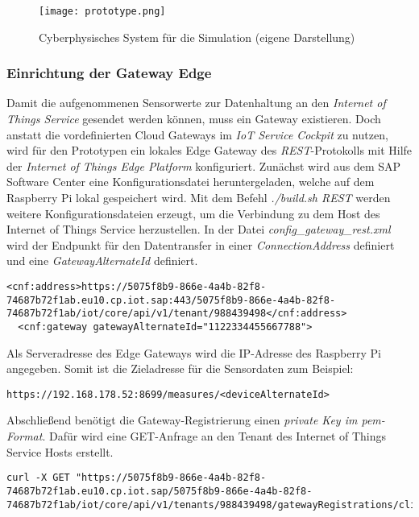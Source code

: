 \begin{figure}[H]
  \centering
  \texttt{[image: prototype.png]}
  \caption[Cyberphysisches System für die Simulation]{Cyberphysisches System für die Simulation (eigene Darstellung)}
  \label{raspi}
\end{figure}


\subsubsection{Einrichtung der Gateway Edge}

Damit die aufgenommenen Sensorwerte zur Datenhaltung an den \textit{Internet of Things Service} gesendet werden können, muss ein Gateway existieren. Doch anstatt die vordefinierten Cloud Gateways im \textit{IoT Service Cockpit} zu nutzen, wird für den Prototypen ein lokales Edge Gateway des \textit{REST}-Protokolls mit Hilfe der \textit{Internet of Things Edge Platform} konfiguriert. Zunächst wird aus dem SAP Software Center eine Konfigurationsdatei heruntergeladen, welche auf dem Raspberry Pi lokal gespeichert wird. Mit dem Befehl \textit{./build.sh REST} werden weitere Konfigurationsdateien erzeugt, um die Verbindung zu dem Host des Internet of Things Service herzustellen. In der Datei \textit{config\_gateway\_rest.xml} wird der Endpunkt für den Datentransfer in einer \textit{ConnectionAddress} definiert und eine \textit{GatewayAlternateId} definiert.

\begin{lstlisting}[caption= Gateway-Verbindung zur Cloud]
  <cnf:address>https://5075f8b9-866e-4a4b-82f8-74687b72f1ab.eu10.cp.iot.sap:443/5075f8b9-866e-4a4b-82f8-74687b72f1ab/iot/core/api/v1/tenant/988439498</cnf:address>
  <cnf:gateway gatewayAlternateId="1122334455667788">
\end{lstlisting}
Als Serveradresse des Edge Gateways wird die IP-Adresse des Raspberry Pi angegeben. Somit ist die Zieladresse für die Sensordaten zum Beispiel:

\begin{lstlisting}[caption= Zieladresse für Sensorwerte]
  https://192.168.178.52:8699/measures/<deviceAlternateId>\end{lstlisting}

\noindent Abschließend benötigt die Gateway-Registrierung einen \textit{private Key im pem-Format}. Dafür wird eine GET-Anfrage an den Tenant des Internet of Things Service Hosts erstellt.

\begin{lstlisting}[caption= GET-Anfrage für einen Client-Key]
curl -X GET "https://5075f8b9-866e-4a4b-82f8-74687b72f1ab.eu10.cp.iot.sap/5075f8b9-866e-4a4b-82f8-74687b72f1ab/iot/core/api/v1/tenants/988439498/gatewayRegistrations/clientCertificate/pem\end{lstlisting}

